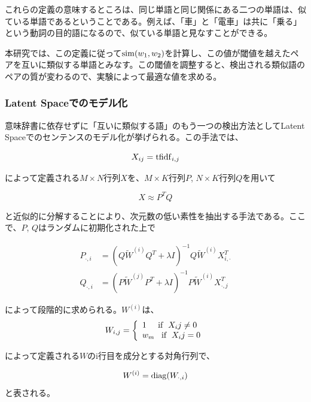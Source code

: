 \documentclass[12pt]{jarticle}
\begin{document}
これらの定義の意味するところは、同じ単語と同じ関係にある二つの単語は、似ている単語であるということである。例えば、「車」と「電車」は共に「乗る」という動詞の目的語になるので、似ている単語と見なすことができる。

本研究では、この定義に従って${\rm sim}(w_1, w_2)$を計算し、この値が閾値を越えたペアを互いに類似する単語とみなす。この閾値を調整すると、検出される類似語のペアの質が変わるので、実験によって最適な値を求める。

\subsubsection{Latent Spaceでのモデル化}
意味辞書に依存せずに「互いに類似する語」のもう一つの検出方法としてLatent Spaceでのセンテンスのモデル化\cite{LatentSpace}が挙げられる。この手法では、

\begin{equation}
  X_{ij} = {\rm tfidf}_{i,j}
\end{equation}

によって定義される$M \times N$行列$X$を、$M \times K$行列$P$, $N \times K$行列$Q$を用いて

\begin{equation}
  X \approx P^T Q
\end{equation}

と近似的に分解することにより、次元数の低い素性を抽出する手法である。ここで、$P$, $Q$はランダムに初期化された上で

\begin{align}
  P_{\cdot ,i} &= (Q\tilde W^{(i)}Q^T + \lambda I)^{-1} Q \tilde W^{(i)} X_{i, \cdot }^T \\
  Q_{\cdot ,i} &= (P\tilde W^{(j)}P^T + \lambda I)^{-1} P \tilde W^{(i)} X_{\cdot , j}^T
\end{align}

によって段階的に求められる。$W^{(i)}$は、
\begin{displaymath}
W_{i,j} = \left\{
\begin{array}{l}
1\;\;\;\;\;{\rm if} \;\; X_ij \neq 0 \\
w_m\;\;\;{\rm if} \;\; X_ij = 0
\end{array}
\right.
\end{displaymath}

によって定義される$W$のi行目を成分とする対角行列で、

\begin{equation}
  W^{(i)} = {\rm diag}(W_{\cdot, i})
\end{equation}
と表される。
\end{document}
